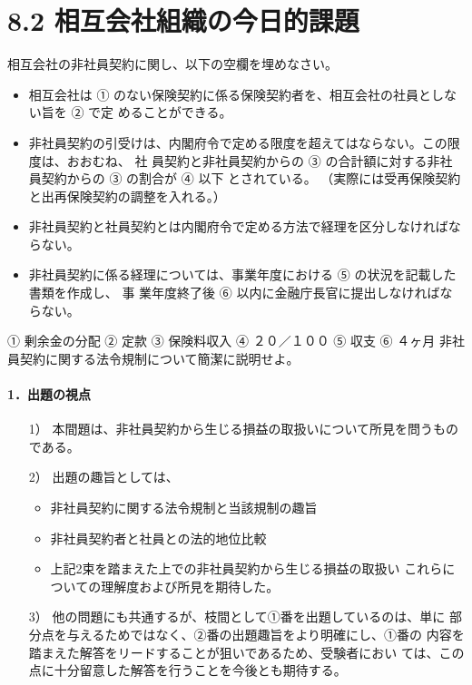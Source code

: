 \documentclass[report,gutter=10mm,fore-edge=10mm,uplatex,dvipdfmx]{jlreq}
\begin{document}
\section{8.2 相互会社組織の今日的課題}
相互会社の非社員契約に関し、以下の空欄を埋めなさい。
\begin{itemize}
 \item 相互会社は ① のない保険契約に係る保険契約者を、相互会社の社員としない旨を
 ② で定 めることができる。
 \item  非社員契約の引受けは、内閣府令で定める限度を超えてはならない。この限度は、おおむね、
社 員契約と非社員契約からの ③
 の合計額に対する非社員契約からの ③ の割合が ④ 以下 とされている。
 （実際には受再保険契約と出再保険契約の調整を入れる。）
 \item  非社員契約と社員契約とは内閣府令で定める方法で経理を区分しなければならない。
 \item  非社員契約に係る経理については、事業年度における ⑤ の状況を記載した書類を作成し、
事 業年度終了後 ⑥ 以内に金融庁長官に提出しなければならない。
\end{itemize}
① 剰余金の分配 ② 定款 ③ 保険料収入 ④ ２０／１００ ⑤ 収支 ⑥ ４ヶ月
非社員契約に関する法令規制について簡潔に説明せよ。
\paragraph{1．出題の視点}
\begin{enumerate}
 \item [1）]本間題は、非社員契約から生じる損益の取扱いについて所見を問うもの
 である。
 \item [2）]出題の趣旨としては、
\begin{itemize}
 \item  非社員契約に関する法令規制と当該規制の趣旨
 \item 非社員契約者と社員との法的地位比較
 \item 上記2束を踏まえた上での非社員契約から生じる損益の取扱い
 これらについての理解度および所見を期待した。
\end{itemize} 
 \item [3）]他の問題にも共通するが、枝間として①番を出題しているのは、単に
 部分点を与えるためではなく、②番の出題趣旨をより明確にし、①番の
 内容を踏まえた解答をリードすることが狙いであるため、受験者におい
 ては、この点に十分留意した解答を行うことを今後とも期待する。
\end{enumerate}
\end{document}
